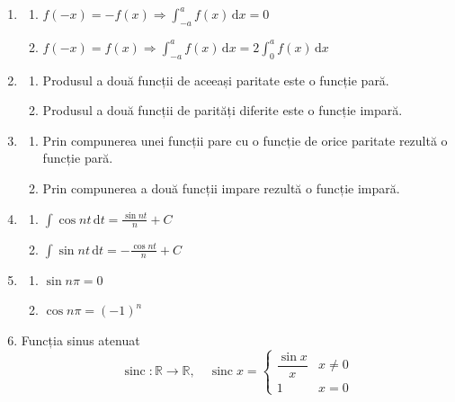\documentclass{article}
\DeclareMathOperator{\sinc}{sinc}
\begin{document}
\begin{enumerate}
\item
\begin{enumerate}
\item \(\displaystyle{f(-x)=-f(x)\Longrightarrow\int_{-a}^a{f(x)\,\mathrm{d}x}=0}\)
\item \(\displaystyle{f(-x)=f(x)\Longrightarrow\int_{-a}^a{f(x)\,\mathrm{d}x}=2\int_0^a{f(x)\,\mathrm{d}x}}\)
\end{enumerate}

\item
\begin{enumerate}
\item Produsul a două funcții de aceeași paritate este o funcție pară.
\item Produsul a două funcții de parități diferite este o funcție impară.
\end{enumerate}
\item
\begin{enumerate}
\item Prin compunerea unei funcții pare cu o funcție de orice paritate rezultă o funcție pară.
\item Prin compunerea a două funcții impare rezultă o funcție impară.
\end{enumerate}

\item
\begin{enumerate}
\item \(\displaystyle{\int{\cos nt\,\mathrm{d}t}=\frac{\sin nt}{n}+C}\)
\item \(\displaystyle{\int{\sin nt\,\mathrm{d}t}=-\frac{\cos nt}{n}+C}\)
\end{enumerate}

\item
\begin{enumerate}
\item \(\sin n\pi=0\)
\item \(\cos n\pi=(-1)^n\)
\end{enumerate}

\item Funcția sinus atenuat
\begin{displaymath}
    \sinc\colon\mathbb{R}\to\mathbb{R},\quad
    \sinc x=
    \begin{cases}
        \dfrac{\sin x}{x} & x \ne 0 \\
        1 & x=0
    \end{cases}
\end{displaymath}
\end{enumerate}
\end{document}
